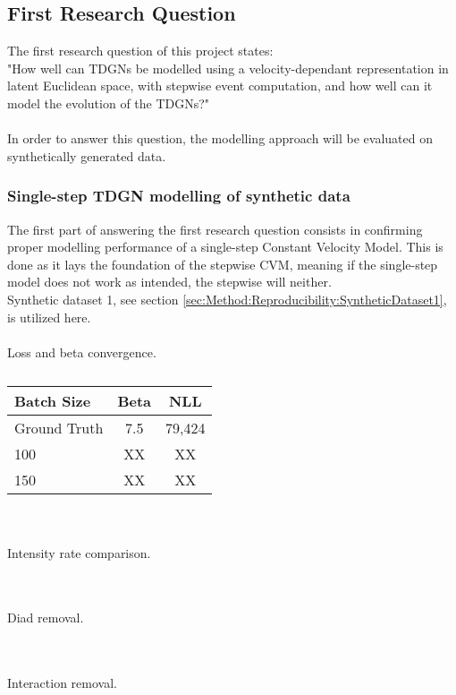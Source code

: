 \subsection{First Research Question}
\label{sec:ResearchQuestion1}
The first research question of this project states:
\\
"How well can TDGNs be modelled using a velocity-dependant representation in latent Euclidean space, with stepwise event computation, and how well can it model the evolution of the TDGNs?"
\\\\
In order to answer this question, the modelling approach will be evaluated on synthetically generated data.


\subsubsection{Single-step TDGN modelling of synthetic data}
\label{sec:ResearchQuestion1:singleStepSynthetic}
The first part of answering the first research question consists in confirming proper modelling performance of a single-step Constant Velocity Model. 
This is done as it lays the foundation of the stepwise CVM, meaning if the single-step model does not work as intended, the stepwise will neither.
\\
Synthetic dataset 1, see section \ref{sec:Method:Reproducibility:SyntheticDataset1}, is utilized here.
\\\\
Loss and beta convergence.

\begin{table}[h!]
\centering
\begin{tabular}{|l|cc|}
\hline
Batch Size   & Beta & NLL\\ \hline
Ground Truth & 7.5  & 79,424      \\
100          & XX   & XX       \\
150          & XX   & XX       \\
\hline
\end{tabular}
\caption{}
\label{tab:SingleStep1}
\end{table}

\\\\
Intensity rate comparison.


\\\\
Diad removal.


\\\\
Interaction removal.
\\\\




